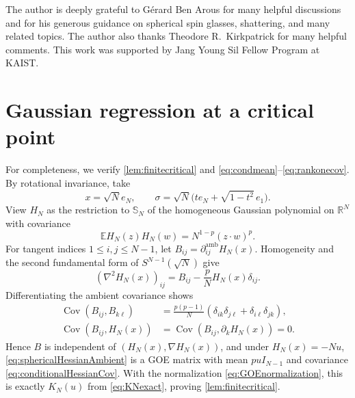 \documentclass[11pt,reqno]{amsart}
\numberwithin{equation}{section}
\theoremstyle{plain}
\theoremstyle{definition}
\theoremstyle{remark}
\newcommand{\SN}{\mathbb{S}_N}
\newcommand{\E}{\mathbb E}
\newcommand{\R}{\mathbb R}
\newcommand{\1}{\mathbf 1}
\begin{document}
The author is deeply grateful to G\'erard Ben Arous for many helpful
discussions and for his generous guidance on spherical spin glasses,
shattering, and many related topics.  The author also thanks Theodore
R.~Kirkpatrick for many helpful comments. This work was supported by Jang Young Sil
Fellow Program at KAIST.

\appendix

\section{Gaussian regression at a critical point}\label{app:regression}

For completeness, we verify \cref{lem:finitecritical} and
\eqref{eq:condmean}--\eqref{eq:rankonecov}.  By rotational invariance, take
\[
 x=\sqrt N e_N,
 \qquad
 \sigma=\sqrt N\bigl(te_N+\sqrt{1-t^2}\,e_1\bigr).
\]
View \(H_N\) as the restriction to \(\SN\) of the homogeneous Gaussian
polynomial on \(\R^N\) with covariance
\[
 \E H_N(z)H_N(w)=N^{1-p}(z\cdot w)^p.
\]
For tangent indices \(1\leq i,j\leq N-1\), let
\(B_{ij}=\partial^{\mathrm{amb}}_{ij}H_N(x)\).  Homogeneity and the
second fundamental form of \(S^{N-1}(\sqrt N)\) give
\begin{equation}\label{eq:sphericalHessianAmbient}
 (\nabla^2H_N(x))_{ij}
 =B_{ij}-\frac pN H_N(x)\delta_{ij}.
\end{equation}
Differentiating the ambient covariance shows
\begin{align}
 \operatorname{Cov}(B_{ij},B_{k\ell})
 &=\frac{p(p-1)}N
 (\delta_{ik}\delta_{j\ell}+\delta_{i\ell}\delta_{jk}),
 \label{eq:ambientHessianCov}\\
 \operatorname{Cov}(B_{ij},H_N(x))
 &=\operatorname{Cov}(B_{ij},\partial_kH_N(x))=0.
 \label{eq:ambientHessianIndependent}
\end{align}
Hence \(B\) is independent of \((H_N(x),\nabla H_N(x))\), and under
\(H_N(x)=-Nu\), \eqref{eq:sphericalHessianAmbient} is a GOE matrix with
mean \(puI_{N-1}\) and covariance \eqref{eq:conditionalHessianCov}.
With the normalization \eqref{eq:GOEnormalization}, this is exactly
\(K_N(u)\) from \eqref{eq:KNexact}, proving \cref{lem:finitecritical}.
\end{document}
